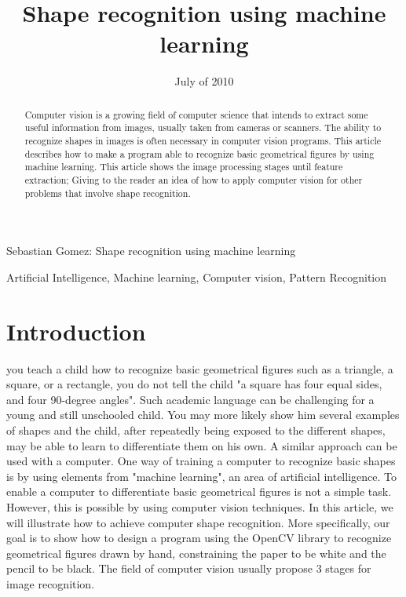 \documentclass[10pt,journal]{IEEEtran}
\begin{document}
\title {Shape recognition using machine learning}
\date {July of 2010}

	{Sebastian Gomez: Shape recognition using machine learning}

	\maketitle

	\begin{abstract}
		Computer vision is a growing field of computer science that intends to extract
		some useful information from images, usually taken from cameras or scanners.
		The ability to recognize shapes in images is often necessary in computer vision
		programs. 
		This article describes how to make a program able to recognize basic 
		geometrical figures by using machine learning. This article shows the image 
		processing stages until	feature extraction; Giving to the reader an idea of how
		to apply computer vision for other problems that involve shape recognition.
	\end{abstract}
	
	\begin{IEEEkeywords}
	Artificial Intelligence, Machine learning, Computer vision, Pattern Recognition
	\end{IEEEkeywords}


	\section{Introduction}
	 you teach a child how to recognize basic geometrical figures such
	as a triangle, a square, or a rectangle, you do not tell the child "a square has four
	equal sides, and four 90-degree angles". Such academic language can be challenging for 
	a young and still unschooled child. You may more likely show him several examples
	of shapes and the child, after repeatedly being exposed to the different shapes, may 
	be able to learn to differentiate them on his own. \newline
	A similar approach can be used with a computer. One way of training a computer to
	recognize basic shapes is by using elements from "machine learning", an area of
	artificial intelligence. To enable a computer to differentiate basic geometrical 
	figures is not a simple task. However, this is possible by using computer vision 
	techniques. In this article, we will illustrate how to achieve computer shape 
	recognition. More specifically, our goal is to show how to design a program using
	the OpenCV library to recognize geometrical figures drawn by hand, constraining
	the paper to be white and the pencil to be black. The field of computer vision
	usually	propose 3 stages for image recognition.
	
\end{document}
